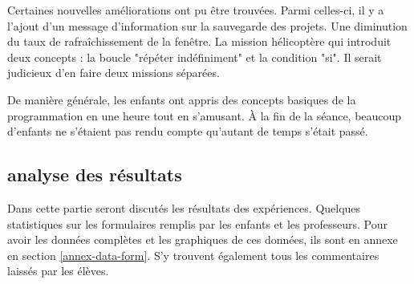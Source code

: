 Certaines nouvelles améliorations ont pu être trouvées. Parmi celles-ci, il y a l'ajout d'un message d'information sur la sauvegarde des projets. Une diminution du taux de rafraîchissement de la fenêtre. La mission hélicoptère qui introduit deux concepts : la boucle "répéter indéfiniment" et la condition "si". Il serait judicieux d'en faire deux missions séparées.

De manière générale, les enfants ont appris des concepts basiques de la programmation en une heure tout en s'amusant. À la fin de la séance, beaucoup d'enfants ne s'étaient pas rendu compte qu'autant de temps s'était passé.
\subsection{analyse des résultats}
\label{analyse-exp}
Dans cette partie seront discutés les résultats des expériences. Quelques statistiques sur les formulaires remplis par les enfants et les professeurs. Pour avoir les données complètes et les graphiques de ces données, ils sont en annexe en section \ref{annex-data-form}. S'y trouvent également tous les commentaires laissés par les élèves.

